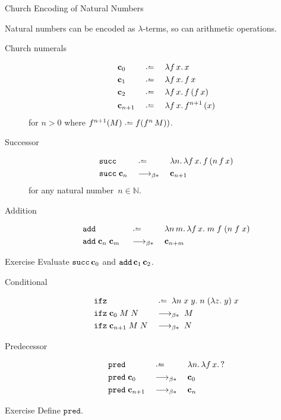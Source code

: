 \begin{frame}[allowframebreaks]{Church Encoding of Natural Numbers}

  Natural numbers can be encoded as $\lambda$-terms, so can arithmetic operations. 
  \begin{description}
    \item[Church numerals] 
      \begin{align*}
        &\bc_0 &&\defeq\;&& \lambda f\,x.\, x \\
        &\bc_{1} &&\defeq\;&& \lambda f\,x.\, f\,x \\
        &\bc_{2} &&\defeq\;&& \lambda f\,x.\, f\,(f\,x) \\
        &\bc_{n+1} &&\defeq\;&& \lambda f\,x.\, f^{n+1}\,(x)
      \end{align*}
      for $n > 0$ where $f^{n+1}(M)  \defeq f (f^n\, M))$.
    \item[Successor]
      \begin{align*}
        & \mathtt{succ} && \defeq\; && \lambda n.\,\lambda f\,x.\, f\,(n\,f\,x) \\
        & \mathtt{succ}\;\bc_n && \reduce\; && \bc_{n+1}
      \end{align*}
      for any natural number~$n \in \mathbb{N}$.
    \item[Addition]
      \begin{align*}
        & \mathtt{add} && \defeq\; && \lambda n\,m.\,\lambda f\,x.\;
        m\;f\;(n\;f\;x)  \\ & \mathtt{add}\;\bc_{n}\;\bc_{m}\;
                            && \reduce\; && \bc_{n + m}
      \end{align*}
  \end{description}

  \begin{block}{Exercise}
    Evaluate $\mathtt{succ}\,\mathbf{c}_0$ and $\mathtt{add}\,\mathbf{c}_{1}\,\mathbf{c}_{2}$. 
  \end{block}

  \begin{description}
    \item[Conditional]
      \begin{align*}
        & \mathtt{ifz} && \defeq \; \lambda n\;x\;y.\;n\;(\lambda z.\;y)\;x 
        \\
        & \mathtt{ifz}\;\bc_0\;M\;N && \reduce \; M \\
        & \mathtt{ifz}\;\bc_{n+1}\;M\;N && \reduce \; N
      \end{align*}
    \item[Predecessor]
      \begin{align*}
        & \mathtt{pred} && \defeq\; && \lambda n.\, \lambda f\,x.\, ? \\
        & \mathtt{pred}\;\bc_{0}  && \reduce\; && \bc_{0} \\
        & \mathtt{pred}  \;\bc_{n+1} && \reduce\; && \bc_{n}
      \end{align*}
  \end{description}
  \begin{block}{Exercise}
    Define $\mathtt{pred}$.
  \end{block}
\end{frame}


